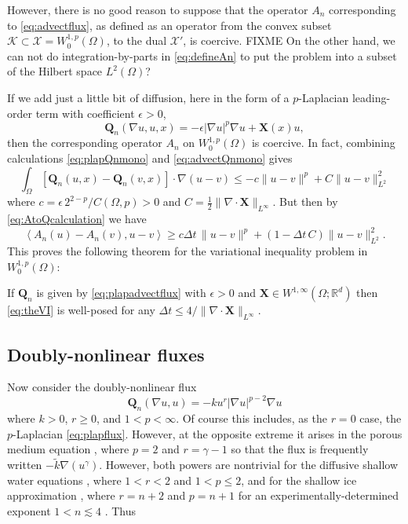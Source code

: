 \documentclass[final,leqno,onefignum,onetabnum]{siamltex1213bueler}
\newcommand\bQ{\mathbf{Q}}
\newcommand\bX{\mathbf{X}}
\newcommand{\Div}{\nabla\cdot}
\newcommand\eps{\epsilon}
\renewcommand{\grad}{\nabla}
\newcommand{\ip}[2]{\ensuremath{\left<#1,#2\right>}}
\newcommand\RR{\mathbb{R}}
\begin{document}
However, there is no good reason to suppose that the operator $A_n$ corresponding to \eqref{eq:advectflux}, as defined as an operator from the convex subset $\mathcal{K} \subset \mathcal{X} = W_0^{1,p}(\Omega)$, to the dual $\mathcal{X}'$, is coercive.  FIXME On the other hand, we can not do integration-by-parts in  \eqref{eq:defineAn} to put the problem into a subset of the Hilbert space $L^2(\Omega)$?

If we add just a little bit of diffusion, here in the form of a $p$-Laplacian leading-order term with coefficient $\eps>0$,
\begin{equation}
  \bQ_n(\grad u,u,x) = -\eps |\grad u|^p \grad u + \bX(x) u,   \label{eq:plapadvectflux}
\end{equation}
then the corresponding operator $A_n$ on $W_0^{1,p}(\Omega)$ is coercive.  In fact, combining calculations \eqref{eq:plapQnmono} and \eqref{eq:advectQnmono} gives
\begin{equation}
\int_\Omega \left[\bQ_n(u,x) - \bQ_n(v,x)\right] \cdot \grad (u - v) \le - c \|u-v\|^p + C \|u-v\|_{L^2}^2
\end{equation}
where $c=\eps\, 2^{2-p}/C(\Omega,p)>0$ and $C = \frac{1}{2}\|\Div\bX\|_{L^\infty}$.  But then by \eqref{eq:AtoQcalculation} we have
\begin{equation}
\ip{A_n(u) - A_n(v)}{u-v} \ge c \Delta t\, \|u-v\|^p + (1-\Delta t\,C) \|u-v\|_{L^2}^2.
\end{equation}
This proves the following theorem for the variational inequality problem in $W_0^{1,p}(\Omega)$:

\begin{theorem}  \label{thm:plabadvectwellposed}  If $\bQ_n$ is given by \eqref{eq:plapadvectflux} with $\eps>0$ and $\bX \in W^{1,\infty}(\Omega;\RR^d)$ then \eqref{eq:theVI} is well-posed for any $\Delta t \le 4 / \|\Div \bX\|_{L^\infty}$.
\end{theorem}

\subsection{Doubly-nonlinear fluxes} \label{subsec:powertransform}  Now consider the doubly-nonlinear \cite{Raviart1970} flux
\begin{equation}
  \bQ_n(\grad u,u) = - k u^r |\grad u|^{p-2} \grad u \label{eq:doubleflux}
\end{equation}
where $k>0$, $r\ge 0$, and $1<p<\infty$.  Of course this includes, as the $r=0$ case, the $p$-Laplacian \eqref{eq:plapflux}.  However, at the opposite extreme it arises in the porous medium equation \cite{Vazquez2007}, where $p=2$ and $r=\gamma-1$ so that the flux is frequently written $- \tilde k \grad(u^\gamma)$.  However, both powers are nontrivial for the diffusive shallow water equations \cite{AlonsoSantillanaDawson}, where $1<r<2$ and $1<p\le 2$, and for the shallow ice approximation \cite{CDDSV,JouvetBueler2012}, where $r=n+2$ and $p=n+1$ for an experimentally-determined exponent $1 < n \lesssim 4$ \cite{GoldsbyKohlstedt2001}.  Thus
\end{document}
